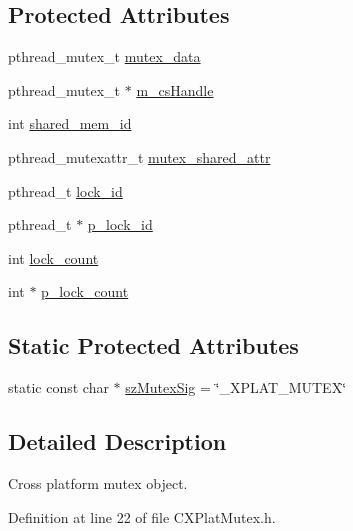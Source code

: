 \subsection*{\-Protected \-Attributes}
\begin{DoxyCompactItemize}
\item 
pthread\-\_\-mutex\-\_\-t \hyperlink{class_c_x_plat_mutex_a60c63d60e01fde08a5eeb2989bf96436}{mutex\-\_\-data}
\item 
pthread\-\_\-mutex\-\_\-t $\ast$ \hyperlink{class_c_x_plat_mutex_a22ce962174742cd232815a7fcfae5905}{m\-\_\-cs\-Handle}
\item 
int \hyperlink{class_c_x_plat_mutex_ab29172075e4697ebb5250c51a49bd1c1}{shared\-\_\-mem\-\_\-id}
\item 
pthread\-\_\-mutexattr\-\_\-t \hyperlink{class_c_x_plat_mutex_a6bfc740435b05cfeee78bdf00839e41a}{mutex\-\_\-shared\-\_\-attr}
\item 
pthread\-\_\-t \hyperlink{class_c_x_plat_mutex_a9c41baa3d5371a523333843b8149bfc0}{lock\-\_\-id}
\item 
pthread\-\_\-t $\ast$ \hyperlink{class_c_x_plat_mutex_ae7191ff25f679a8ea9d29322697d8f6c}{p\-\_\-lock\-\_\-id}
\item 
int \hyperlink{class_c_x_plat_mutex_a64d6f2b157694146b3836879ca282050}{lock\-\_\-count}
\item 
int $\ast$ \hyperlink{class_c_x_plat_mutex_a15edebbd7d57d152b835053291047500}{p\-\_\-lock\-\_\-count}
\end{DoxyCompactItemize}
\subsection*{\-Static \-Protected \-Attributes}
\begin{DoxyCompactItemize}
\item 
static const char $\ast$ \hyperlink{class_c_x_plat_mutex_a495937d1eecf5be5943f7127f5984019}{sz\-Mutex\-Sig} = \char`\"{}\-\_\-\-X\-P\-L\-A\-T\-\_\-\-M\-U\-T\-E\-X\char`\"{}
\end{DoxyCompactItemize}


\subsection{\-Detailed \-Description}
\-Cross platform mutex object. 

\-Definition at line 22 of file \-C\-X\-Plat\-Mutex.\-h.



